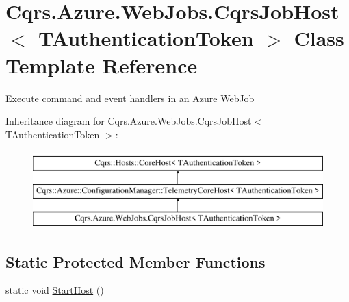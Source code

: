 \hypertarget{classCqrs_1_1Azure_1_1WebJobs_1_1CqrsJobHost}{}\section{Cqrs.\+Azure.\+Web\+Jobs.\+Cqrs\+Job\+Host$<$ T\+Authentication\+Token $>$ Class Template Reference}
\label{classCqrs_1_1Azure_1_1WebJobs_1_1CqrsJobHost}


Execute command and event handlers in an \hyperlink{namespaceCqrs_1_1Azure}{Azure} Web\+Job  


Inheritance diagram for Cqrs.\+Azure.\+Web\+Jobs.\+Cqrs\+Job\+Host$<$ T\+Authentication\+Token $>$\+:\begin{figure}[H]
\begin{center}
\leavevmode
\includegraphics[height=3.000000cm]{classCqrs_1_1Azure_1_1WebJobs_1_1CqrsJobHost}
\end{center}
\end{figure}
\subsection*{Static Protected Member Functions}
\begin{DoxyCompactItemize}
\item 
static void \hyperlink{classCqrs_1_1Azure_1_1WebJobs_1_1CqrsJobHost_a836ef65628bb4b63942beedfb17f1269_a836ef65628bb4b63942beedfb17f1269}{Start\+Host} ()
\end{DoxyCompactItemize}
